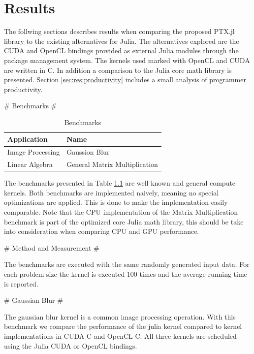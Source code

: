 \chapter{Results}
\label{chap:res}

\begin{markdown}

The follwing sections describes results when comparing the proposed
PTX.jl library to the existing alternatives for Julia. The
alternatives explored are the CUDA and OpenCL bindings provided as
external Julia modules through the package management system. The
kernels used marked with OpenCL and CUDA are written in C. In addition
a comparison to the Julia core math library is presented.  Section
\ref{sec:res:productivity} includes a small analysis of programmer
productivity.

# Benchmarks #
\label{sec:res:bench}

\begin{table}[H]
  \centering
  \begin{tabular}{|l|l|}
    \hline
    Application & Name \\
    \hline
    Image Processing & Gaussion Blur \\
    \hline
    Linear Algebra & General Matrix Multiplication \\
    \hline
  \end{tabular}
  \caption{Benchmarks}
  \label{res:benchmarks}
\end{table}

The benchmarks presented in Table \ref{res:benchmarks} are well known
and general compute kernels. Both benchmarks are implemented naively,
meaning no special optimizations are applied. This is done to make the
implementation easily comparable. Note that the CPU implementation of
the Matrix Multiplication benchmark is part of the optimized core
Julia math library, this should be take into consideration when
comparing CPU and GPU performance.

# Method and Measurement #
\label{sec:res:measure}

The benchmarks are executed with the same randomly generated input
data. For each problem size the kernel is executed 100 times and the
average running time is reported.

# Gaussian Blur #

The gaussian blur kernel is a common image processing operation. With
this benchmark we compare the performance of the julia kernel compared
to kernel implementations in CUDA C and OpenCL C. All three kernels are
scheduled using the Julia CUDA or OpenCL bindings. 


\end{markdown}
